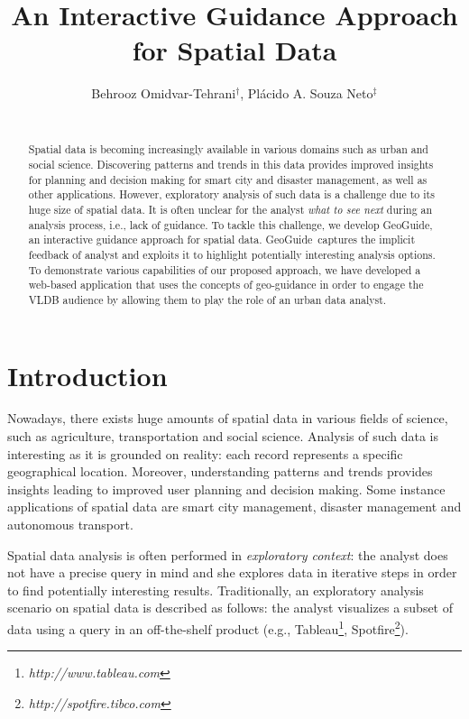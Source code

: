 \documentclass{vldb}
\title{An Interactive Guidance Approach for Spatial Data}
\author{
Behrooz Omidvar-Tehrani$^{\dag}$, Pl\'acido A. Souza Neto$^{\ddag}$\\
\affaddr{
$^{\dag}$The Ohio State University, USA, $^{\ddag}$Federal Institute of Rio Grande do Norte - IFRN, Brazil}\\
\affaddr{
$^{\dag}$\path{omidvar-tehrani.1@osu.edu},
$^{\ddag}$\path{placido.neto@ifrn.edu.br}
}}
\date{}
\newcommand{\framework}{{\sc GeoGuide}}
\begin{document}
\maketitle

\begin{abstract}
Spatial data is becoming increasingly available in various domains such as urban and social science. Discovering patterns and trends in this data provides improved insights for planning and decision making for smart city and disaster management, as well as other applications. However, exploratory analysis of such data is a challenge due to its huge size of spatial data. It is often unclear for the analyst {\em what to see next} during an analysis process, i.e., lack of guidance. To tackle this challenge, we develop \framework, an interactive guidance approach for spatial data. \framework\ captures the implicit feedback of analyst and exploits it to highlight potentially interesting analysis options. To demonstrate various capabilities of our proposed approach, we have developed a web-based application that uses the concepts of geo-guidance in order to engage the VLDB audience by allowing them to play the role of an urban data analyst.
\end{abstract}

\section{Introduction} 
Nowadays, there exists huge amounts of spatial data in various fields of science, such as agriculture, transportation and social science. Analysis of such data is interesting as it is grounded
on reality: each record represents a specific geographical location. Moreover, understanding patterns and trends provides insights leading to improved user planning and decision making. Some instance applications of spatial data are smart city management, disaster management and autonomous transport.


Spatial data analysis is often performed in {\em exploratory context}: the analyst does not have a precise query in mind and she explores data in iterative steps in order to find potentially interesting results. Traditionally, an exploratory analysis scenario on spatial data is described as follows: the analyst visualizes a subset of data using a query in an off-the-shelf product (e.g., Tableau\footnote{\it http://www.tableau.com},
Spotfire\footnote{\it http://spotfire.tibco.com}). %
\end{document}
